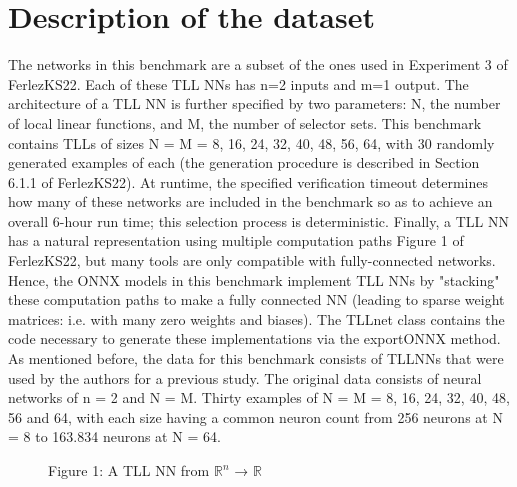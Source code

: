 \documentclass[12pt,a4paper]{report}
\newcommand\tab[1][5mm]{\hspace*{#1}}
\theoremstyle{definition}
\theoremstyle{remark}
\begin{document}
\chapter{Description of the dataset}
\tab The networks in this benchmark are a subset of the ones used in Experiment 3 of FerlezKS22\cite{tll_fast_algorithm}. Each of these TLL NNs has n=2 inputs and m=1 output. The architecture of a TLL NN is further specified by two parameters: N, the number of local linear functions, and M, the number of selector sets. This benchmark contains TLLs of sizes N = M = 8, 16, 24, 32, 40, 48, 56, 64, with 30 randomly generated examples of each (the generation procedure is described in Section 6.1.1 of FerlezKS22\cite{tll_fast_algorithm}). At runtime, the specified verification timeout determines how many of these networks are included in the benchmark so as to achieve an overall 6-hour run time; this selection process is deterministic. Finally, a TLL NN has a natural representation using multiple computation paths Figure 1 of FerlezKS22\cite{tll_fast_algorithm}, but many tools are only compatible with fully-connected networks. Hence, the ONNX models in this benchmark implement TLL NNs by "stacking" these computation paths to make a fully connected NN (leading to sparse weight matrices: i.e. with many zero weights and biases). The TLLnet\cite{tll_net} class contains the code necessary to generate these implementations via the exportONNX method.\cite{tll_git}\\
As mentioned before, the data for this benchmark consists of TLLNNs that were used by the authors for a previous study. The original data consists of neural networks of n = 2 and N = M. Thirty examples of N = M = 8, 16, 24, 32, 40, 48, 56 and 64, with each size having a common neuron count from 256 neurons at N = 8 to 163.834 neurons at N = 64. \\



\begin{figure}[H]
\centering
{}
\caption{Figure 1: A TLL NN from \(\mathbb{R}^n\) → \(\mathbb{R}\)\cite{relu_architecture}}
\label{fig:relu_architecture}
\end{figure}
\end{document}
